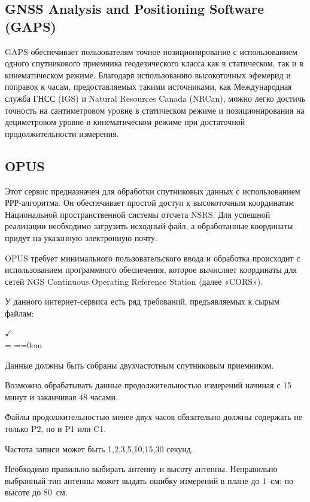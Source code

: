 \subsection{GNSS Analysis and Positioning Software (GAPS)}\label{subsec:ch2/sec1/sub5}

GAPS обеспечивает пользователям точное позиционирование с использованием одного спутникового приемника геодезического класса как в статическом, так и в кинематическом режиме. Благодаря использованию высокоточных эфемерид и поправок к часам, предоставляемых такими источниками, как Международная служба ГНСС (IGS) и Natural Resources Canada (NRCan), можно легко достичь точность на сантиметровом уровне в статическом режиме и позиционирования на дециметровом уровне в кинематическом режиме при достаточной продолжительности измерения.

\subsection{OPUS}\label{subsec:ch2/sec1/sub6}

Этот сервис предназначен для обработки спутниковых данных с использованием РРР-алгоритма. Он обеспечивает простой доступ к высокоточным координатам Национальной пространственной системы отсчета NSRS.  Для успешной реализации необходимо загрузить исходный файл, а обработанные координаты придут на указанную электронную почту.

OPUS требует минимального пользовательского ввода и обработка происходит с использованием программного обеспечения, которое вычисляет координаты для сетей NGS Continuous Operating Reference Station (далее «CORS»). 

У данного интернет-сервиса есть ряд требований, предъявляемых к сырым файлам:

\begin{list}{$ \checkmark $\\[6pt]} {\parsep = \parskip \itemsep=\parsep \topsep=0em}
	\item Данные должны быть собраны двухчастотным спутниковым приемником. 
	\item Возможно обрабатывать данные продолжительностью измерений начиная с 15 минут и заканчивая 48 часами.
	\item Файлы продолжительностью менее двух часов обязательно должны содержать не только P2, но и P1 или C1.
	\item Частота записи может быть 1,2,3,5,10,15,30 секунд.
	\item Необходимо правильно выбирать антенну и высоту антенны. Неправильно выбранный тип антенны может выдать ошибку измерений в плане до 1~см; по высоте до 80~см.
\end{list}

